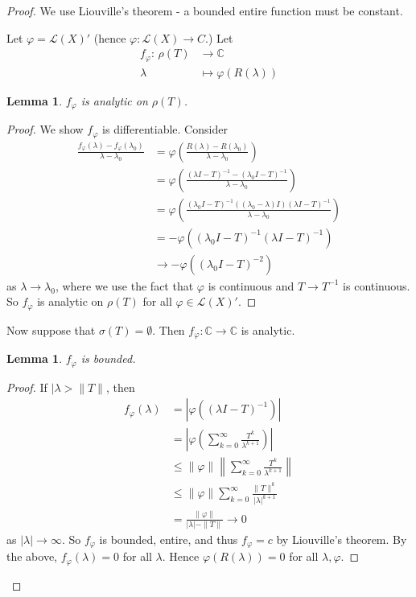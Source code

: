 \documentclass[10pt, oneside, reqno]{amsart}
\theoremstyle{plain}%
\newtheorem{lem}[thm]{Lemma}
\theoremstyle{definition}
\theoremstyle{remark}
\newcommand{\Com}{\mathbb{C}}
\newcommand{\mapping}[5]{\begin{align*}
    #1 : \,     #2 &\rightarrow #3 \\
            #4  &\mapsto #5
\end{align*}    
}
\renewcommand{\phi}{\varphi}
\begin{document}
\begin{proof}
    We use Liouville's theorem - a bounded entire function must be constant.  
    
    Let $\phi = \mathcal L(X)'$ (hence $\phi : \mathcal L(X) \rightarrow C$.)  Let \mapping{f_\phi}{\rho(T)}{\Com}{\lambda}{\phi(R(\lambda))} 
    \begin{lem}
     $f_\phi$ is analytic on $\rho(T)$.         
    \end{lem}
    \begin{proof}
        We show $f_\phi$ is differentiable.  Consider \begin{align*}
            \frac{f_\phi(\lambda) - f_\phi(\lambda_0)}{\lambda - \lambda_0} &= \phi\left(\frac{R(\lambda) - R(\lambda_0)}{\lambda - \lambda_0} \right)  \\
            &= \phi \left( \frac{(\lambda I - T)^{-1} - (\lambda_0 I - T)^{-1}}{\lambda - \lambda_0}  \right) \\
            &= \phi \left( \frac{(\lambda_0 I - T)^{-1}( (\lambda_0 - \lambda) I)(\lambda I - T)^{-1}}{\lambda - \lambda_0} \right) \\
            &= -\phi \left( (\lambda_0 I - T)^{-1} (\lambda I - T)^{-1} \right) \\
            &\rightarrow -\phi \left( (\lambda_0 I - T)^{-2} \right)
        \end{align*} 
        as $\lambda \rightarrow \lambda_0$, where we use the fact that $\phi$ is continuous and $T \rightarrow T^{-1}$ is continuous.    So $f_\phi$ is analytic on $\rho(T)$ for all $\phi \in \mathcal L(X)'$.  
    \end{proof}
    
    Now suppose that $\sigma(T) = \emptyset$.  Then $f_\phi : \Com \rightarrow \Com$ is analytic.
    
    \begin{lem}
        $f_\phi$ is bounded.  
    \end{lem}
    \begin{proof}
        If $|\lambda > \| T \|$, then \begin{align*}
            f_\phi(\lambda) &= \left| \phi \left( ( \lambda I - T)^{-1} \right) \right| \\
                            &= \left| \phi \left( \sum_{k=0}^\infty \frac{T^k}{\lambda^{k+1}} \right) \right| \\
                            &\leq \| \phi \| \left \| \sum_{k=0}^\infty \frac{T^k}{\lambda^{k+1}} \right \| \\
                            &\leq \| \phi \| \sum_{k=0}^\infty \frac{\| T \|^k}{| \lambda|^{k+1}} \\
                            &= \frac{ \| \phi \|}{ |\lambda | - \| T \|} \rightarrow 0
        \end{align*} as $|\lambda| \rightarrow \infty$.  So $f_\phi$ is bounded, entire, and thus $f_\phi = c$ by Liouville's theorem.  By the above, $f_\phi(\lambda) = 0$ for all $\lambda$.  Hence $\phi(R(\lambda)) = 0$ for all $\lambda, \phi$.
        

\end{proof}
\end{proof}
\end{document}
